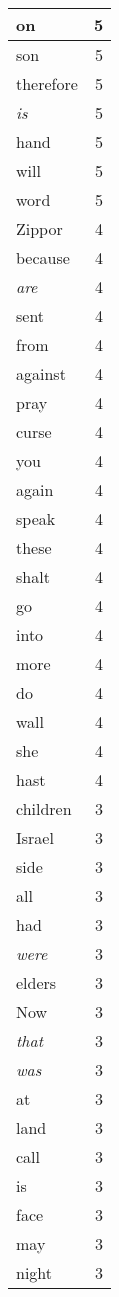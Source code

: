 \begin{center}
\begin{longtable}{l|r}
on & 5\\ \hline 
son & 5\\ \hline 
therefore & 5\\ \hline 
\emph{is} & 5\\ \hline 
hand & 5\\ \hline 
will & 5\\ \hline 
word & 5\\ \hline 
Zippor & 4\\ \hline 
because & 4\\ \hline 
\emph{are} & 4\\ \hline 
sent & 4\\ \hline 
from & 4\\ \hline 
against & 4\\ \hline 
pray & 4\\ \hline 
curse & 4\\ \hline 
you & 4\\ \hline 
again & 4\\ \hline 
speak & 4\\ \hline 
these & 4\\ \hline 
shalt & 4\\ \hline 
go & 4\\ \hline 
into & 4\\ \hline 
more & 4\\ \hline 
do & 4\\ \hline 
wall & 4\\ \hline 
she & 4\\ \hline 
hast & 4\\ \hline 
children & 3\\ \hline 
Israel & 3\\ \hline 
side & 3\\ \hline 
all & 3\\ \hline 
had & 3\\ \hline 
\emph{were} & 3\\ \hline 
elders & 3\\ \hline 
Now & 3\\ \hline 
\emph{that} & 3\\ \hline 
\emph{was} & 3\\ \hline 
at & 3\\ \hline 
land & 3\\ \hline 
call & 3\\ \hline 
is & 3\\ \hline 
face & 3\\ \hline 
may & 3\\ \hline 
night & 3\\ \hline 

\end{longtable}
\end{center}
